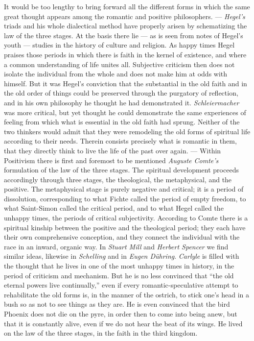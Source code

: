 \documentclass[12pt,a4paper,openany]{book}
\newcommand{\opage}[1]{\marginnote{\footnotesize\textit{[#1]}}}
\begin{document}
It would be too lengthy to bring forward all the
different forms in which the same great thought
appears among the romantic and positive philosophers. --- \emph{Hegel's}
triads and his whole dialectical method have properly
arisen by schematizing the law of the three stages. At
the basis there lie --- as is seen from notes of Hegel's
youth --- studies in the history of culture and religion. As
happy times Hegel praises those periods in which there is faith
in the kernel of existence, and where a common understanding of life
unites all. Subjective criticism then does not isolate the individual
from the whole and does not make him at odds with himself. But
it was Hegel's conviction that the substantial in the
old faith and in the old order of things could be preserved
through the purgatory of reflection, and in his own philosophy
he thought he had demonstrated it. \emph{Schleiermacher} was more critical,
but yet thought he could demonstrate the same
experiences of feeling from which what is essential in the old faith had
sprung. Neither of the two thinkers would admit that they
were remodeling the old forms of spiritual life according to their needs. Therein
consists precisely what is romantic in them, that they directly
think to live the life of the past over again. --- Within
Positivism there is first and foremost to be mentioned \emph{Auguste Comte's}
formulation of the law of the three stages. The spiritual development
proceeds accordingly through three stages, the theological, the
metaphysical, and the positive. The metaphysical stage is
purely negative and critical; it is a period of dissolution, corresponding
to what Fichte called the period of empty freedom, to what
Saint-Simon called the critical period, and to what Hegel
called the unhappy times, the periods of critical subjectivity.
According to Comte there is a spiritual kinship between the
positive and the theological period; they each have their own
comprehensive conception, and they connect the individual with the race in an
inward, organic way. In \emph{Stuart Mill} and \emph{Herbert Spencer}
we find similar ideas, likewise in \emph{Schelling} and in \emph{Eugen
Dühring}. \emph{Carlyle} is filled with the thought that he lives in
\opage{236}one of the most unhappy times in history, in the period of criticism and
mechanism. But he is no less convinced
that ``the old eternal powers live continually,'' even if
every romantic-speculative attempt to rehabilitate the
old forms is, in the manner of the ostrich, to stick one's head in a
bush so as not to see things as they are. He is even
convinced that the bird Phoenix does not die on the pyre, in order then
to come into being anew, but that it is constantly alive, even if
we do not hear the beat of its wings. He lived on the law of the three stages,
in the faith in the third kingdom.
\end{document}
